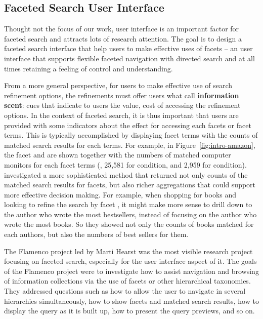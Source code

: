 \subsection{Faceted Search User Interface}
Thought not the focus of our work, user interface is an important factor for faceted search and attracts lots of research attention. The goal is to design a faceted search interface that help users to make effective uses of facets -- an user interface that supports flexible faceted navigation with directed search and at all times retaining a feeling of control and understanding.

From a more general perspective, for users to make effective use of search refinement options, the refinements must offer users what \citet{pirolli2000effect} call \textbf{information scent}: cues that indicate to users the value, cost of accessing the refinement options. In the context of faceted search, it is thus important that users are provided with some indicators about the effect for accessing each facets or facet terms. This is typically accomplished by displaying facet terms with the counts of matched search results for each terms. For example, in Figure~\ref{fig:intro-amazon}, the facet  and  are shown together 
with the numbers of matched computer monitors for each facet terms (\eg, 25,581 for  condition, and 2,959 for  condition). \citet{ben2008beyond} investigated a more sophisticated method that returned not only counts of the matched search results for facets, but also richer aggregations that could support more effective decision making. For example, when shopping for books and looking to refine the search by facet , it might make more sense to drill down to the author who wrote the most bestsellers, instead of focusing on the author who wrote the most books. So they showed not only the counts of books matched for each authors, but also the numbers of best sellers for them.

The Flamenco project led by Marti Hearst was the most visible research project focusing on faceted search, especially for the user interface aspect of it. The goals of the Flamenco project were to investigate how to assist navigation and browsing of information collections via the use of facets or other hierarchical taxonomies. They addressed questions such as how to allow the user to navigate in several hierarchies simultaneously, how to show facets and matched search results, how to display the query as it is built up, how to present the query previews, and so on. 

